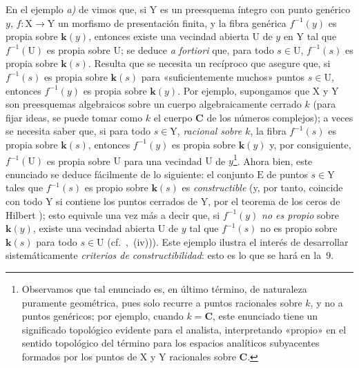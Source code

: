 \begin{env}[8.1.3]
\label{IV.8.1.3}
En el ejemplo \emph{a)} de  vimos que, si $\mathrm{Y}$ es un preesquema íntegro con punto genérico $y$, $f:\mathrm{X}\to\mathrm{Y}$ un morfismo de presentación finita, y la fibra genérica $f^{-1}(y)$ es propia sobre $\boldsymbol{k}(y)$, entonces existe una vecindad abierta $\mathrm{U}$ de $y$ en $\mathrm{Y}$ tal que $f^{-1}(\mathrm{U})$ es propia sobre $\mathrm{U}$; se deduce \emph{a fortiori} que, para todo $s\in\mathrm{U}$, $f^{-1}(s)$ es propia sobre $\boldsymbol{k}(s)$.
Resulta que se necesita un recíproco que asegure que, si $f^{-1}(s)$ es propia sobre $\boldsymbol{k}(s)$ para «suficientemente muchos» puntos $s\in\mathrm{U}$, entonces $f^{-1}(y)$ es propia sobre $\boldsymbol{k}(y)$.
Por ejemplo, supongamos que $\mathrm{X}$ y $\mathrm{Y}$ son preesquemas algebraicos sobre un cuerpo algebraicamente cerrado $k$ (para fijar ideas, se puede tomar como $k$ el cuerpo $\mathbf{C}$ de los números complejos); a veces se necesita saber que, si para todo $s\in\mathrm{Y}$, \emph{racional sobre $k$}, la fibra $f^{-1}(s)$ es propia sobre $\boldsymbol{k}(s)$, entonces $f^{-1}(y)$ es propia sobre $\boldsymbol{k}(y)$ y, por consiguiente, $f^{-1}(\mathrm{U})$ es propia sobre $\mathrm{U}$ para una vecindad $\mathrm{U}$ de $y$\footnote{Observamos que tal enunciado es, en último término, de naturaleza puramente geométrica, pues solo recurre a puntos racionales sobre $k$, y no a puntos genéricos; por ejemplo, cuando $k=\mathbf{C}$, este enunciado tiene un significado topológico evidente para el analista, interpretando «propio» en el sentido topológico del término para los espacios analíticos subyacentes formados por los puntos de $\mathrm{X}$ y $\mathrm{Y}$ racionales sobre $\mathbf{C}$.}.
Ahora bien, este enunciado se deduce fácilmente de lo siguiente: el conjunto $\mathrm{E}$ de puntos $s\in\mathrm{Y}$ tales que $f^{-1}(s)$ es propio sobre $\boldsymbol{k}(s)$ es \emph{constructible} (y, por tanto, coincide con todo $\mathrm{Y}$ si contiene los puntos cerrados de $\mathrm{Y}$, por el teorema de los ceros de Hilbert ); esto equivale una vez más a decir que, si $f^{-1}(y)$ \emph{no es propio} sobre $\boldsymbol{k}(y)$, existe una vecindad abierta $\mathrm{U}$ de $y$ tal que $f^{-1}(s)$ no es propio sobre $\boldsymbol{k}(s)$ para todo $s\in\mathrm{U}$ (cf.\ ,~(iv))).
Este ejemplo ilustra el interés de desarrollar sistemáticamente \emph{criterios de constructibilidad}: esto es lo que se hará en la \textsection\,9.
\end{env}

